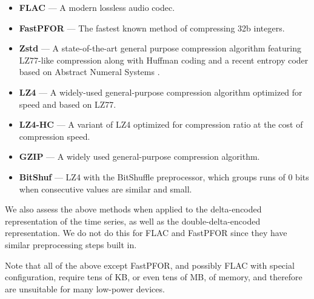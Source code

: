 \begin{itemize}[leftmargin=4mm]
\item \textbf{FLAC} \cite{flac} --- A modern lossless audio codec.
\item \textbf{FastPFOR} \cite{fastpfor} --- The fastest known method of compressing 32b integers.
\item \textbf{Zstd} \cite{zstd} --- A state-of-the-art general purpose compression algorithm featuring LZ77-like compression along with Huffman coding and a recent entropy coder \cite{fse} based on Abstract Numeral Systems \cite{ans}.
\item \textbf{LZ4} \cite{lz4} --- A widely-used general-purpose compression algorithm optimized for speed and based on LZ77.
\item \textbf{LZ4-HC} \cite{lz4} --- A variant of LZ4 optimized for compression ratio at the cost of compression speed.
\item \textbf{GZIP} \cite{gzip} --- A widely used general-purpose compression algorithm.
\item \textbf{BitShuf} \cite{bitshuf} --- LZ4 with the BitShuffle preprocessor, which groups runs of 0 bits when consecutive values are similar and small.
\end{itemize}

We also assess the above methods when applied to the delta-encoded representation of the time series, as well as the double-delta-encoded representation. We do not do this for FLAC and FastPFOR since they have similar preprocessing steps built in.

Note that all of the above except FastPFOR, and possibly FLAC with special configuration, require tens of KB, or even tens of MB, of memory, and therefore are unsuitable for many low-power devices.

